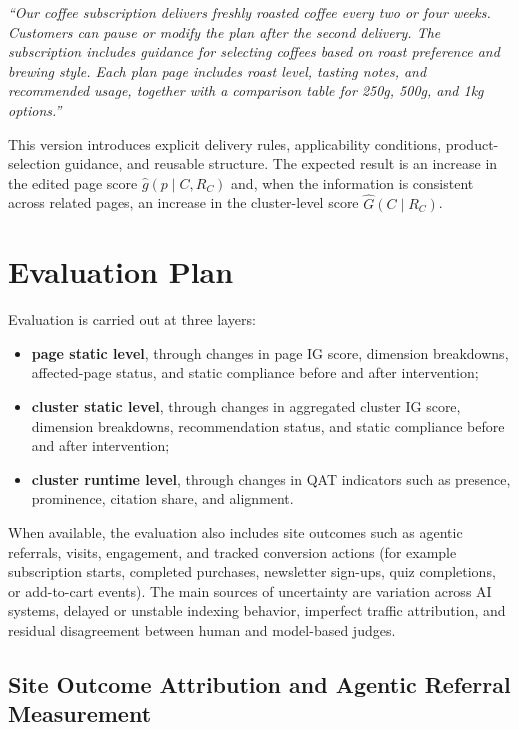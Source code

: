 \documentclass{article}
\begin{document}
\emph{``Our coffee subscription delivers freshly roasted coffee every two or four weeks. Customers can pause or modify the plan after the second delivery. The subscription includes guidance for selecting coffees based on roast preference and brewing style. Each plan page includes roast level, tasting notes, and recommended usage, together with a comparison table for 250g, 500g, and 1kg options.''}

This version introduces explicit delivery rules, applicability conditions, product-selection guidance, and reusable structure. The expected result is an increase in the edited page score \(\hat{g}(p \mid C,R_C)\) and, when the information is consistent across related pages, an increase in the cluster-level score \(\hat{G}(C \mid R_C)\).

\section{Evaluation Plan}

Evaluation is carried out at three layers:
\begin{itemize}
    \item \textbf{page static level}, through changes in page IG score, dimension breakdowns, affected-page status, and static compliance before and after intervention;
    \item \textbf{cluster static level}, through changes in aggregated cluster IG score, dimension breakdowns, recommendation status, and static compliance before and after intervention;
    \item \textbf{cluster runtime level}, through changes in QAT indicators such as presence, prominence, citation share, and alignment.
\end{itemize}

When available, the evaluation also includes site outcomes such as agentic referrals, visits, engagement, and tracked conversion actions (for example subscription starts, completed purchases, newsletter sign-ups, quiz completions, or add-to-cart events). The main sources of uncertainty are variation across AI systems, delayed or unstable indexing behavior, imperfect traffic attribution, and residual disagreement between human and model-based judges.

\subsection{Site Outcome Attribution and Agentic Referral Measurement}
\end{document}
